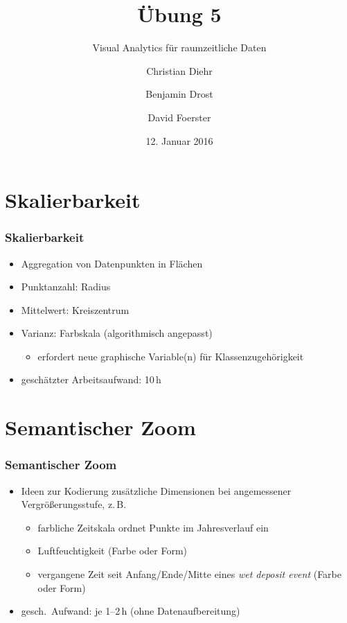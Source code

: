 \documentclass{beamer}
\title{Übung 5}
\subtitle{Visual Analytics für raumzeitliche Daten}
\author{Christian Diehr \and Benjamin Drost \and David Foerster}
\institute{Institut für Informatik\\Humboldt-Universität zu Berlin}
\date{12. Januar 2016}
\begin{document}
    \begin{frame}
        \titlepage
    \end{frame}
    \logo %
        
    \section{Skalierbarkeit}
    \begin{frame}
			\frametitle{Skalierbarkeit}
			\begin{itemize}
				\setlength\itemsep{1em}
				\item Aggregation von Datenpunkten in Flächen
				\item Punktanzahl: Radius
				\item Mittelwert: Kreiszentrum
				\item Varianz: Farbskala (algorithmisch angepasst)
					\begin{itemize}
						\item erfordert neue graphische Variable(n) für Klassenzugehörigkeit
					\end{itemize}
				\item geschätzter Arbeitsaufwand: 10\,h
			\end{itemize}
    \end{frame}
    
    \section{Semantischer Zoom}
    \begin{frame}
			\frametitle{Semantischer Zoom}
			\begin{itemize}
				\setlength\itemsep{1em}
				\item Ideen zur Kodierung zusätzliche Dimensionen bei angemessener Vergrößerungsstufe, z.\,B.
					\begin{itemize}
						\item farbliche Zeitskala ordnet Punkte im Jahresverlauf ein
						\item Luftfeuchtigkeit (Farbe oder Form)
						\item vergangene Zeit seit Anfang/Ende/Mitte eines \emph{wet deposit event} (Farbe oder Form)
					\end{itemize}
				\item gesch.\ Aufwand: je 1--2\,h (ohne Datenaufbereitung)
			\end{itemize}
    \end{frame}
    
\end{document}
